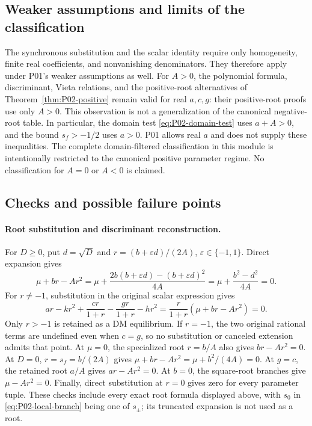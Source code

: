 \subsection{Weaker assumptions and limits of the classification}
The synchronous substitution and the scalar identity require only
homogeneity, finite real coefficients, and nonvanishing denominators.
They therefore apply under P01's weaker assumptions as well.
For $A>0$, the polynomial formula, discriminant, Vieta relations,
and the positive-root alternatives of Theorem~\ref{thm:P02-positive}
remain valid for real $a,c,g$: their positive-root proofs use only
$A>0$. This observation is not a generalization of the canonical
negative-root table. In particular, the domain test
\eqref{eq:P02-domain-test} uses $a+A>0$, and the bound $s_f>-1/2$
uses $a>0$. P01 allows real $a$ and does not supply these inequalities.
The complete domain-filtered classification in this module is
intentionally restricted to the canonical positive parameter regime.
No classification for $A=0$ or $A<0$ is claimed.

\subsection{Checks and possible failure points}
\label{subsec:P02-checks}

\paragraph{Root substitution and discriminant reconstruction.}
For $D\ge0$, put $d=\sqrt D$ and
$r=(b+\varepsilon d)/(2A)$, $\varepsilon\in\{-1,1\}$.
Direct expansion gives
\[
 \mu+br-Ar^2
 =\mu+\frac{2b(b+\varepsilon d)-(b+\varepsilon d)^2}{4A}
 =\mu+\frac{b^2-d^2}{4A}=0.
\]
For $r\ne-1$, substitution in the original scalar expression gives
\[
 ar-kr^2+\frac{cr}{1+r}-\frac{gr}{1+r}-hr^2
   =\frac{r}{1+r}(\mu+br-Ar^2)=0.
\]
Only $r>-1$ is retained as a DM equilibrium. If $r=-1$, the two
original rational terms are undefined even when $c=g$, so no
substitution or canceled extension admits that point.
At $\mu=0$, the specialized root $r=b/A$ also gives
$br-Ar^2=0$. At $D=0$, $r=s_f=b/(2A)$ gives
$\mu+br-Ar^2=\mu+b^2/(4A)=0$. At $g=c$, the retained root
$a/A$ gives $ar-Ar^2=0$. At $b=0$, the square-root branches give
$\mu-Ar^2=0$. Finally, direct substitution at $r=0$ gives zero
for every parameter tuple. These checks include every exact root
formula displayed above, with $s_0$ in \eqref{eq:P02-local-branch}
being one of $s_\pm$; its truncated expansion is not used as a root.

